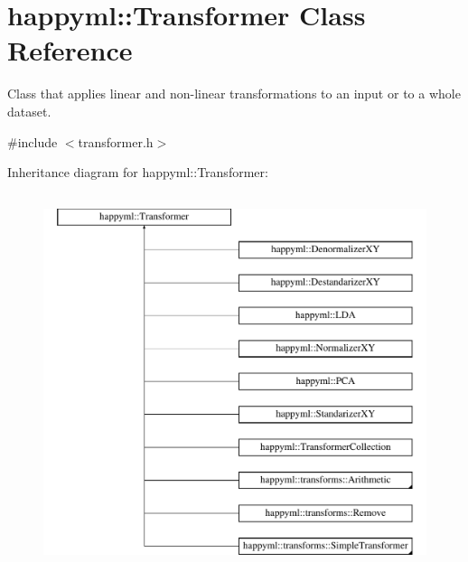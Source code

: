 \hypertarget{classhappyml_1_1Transformer}{}\section{happyml\+:\+:Transformer Class Reference}
\label{classhappyml_1_1Transformer}


Class that applies linear and non-\/linear transformations to an input or to a whole dataset.  




{\ttfamily \#include $<$transformer.\+h$>$}

Inheritance diagram for happyml\+:\+:Transformer\+:\begin{figure}[H]
\begin{center}
\leavevmode
\includegraphics[height=11.000000cm]{classhappyml_1_1Transformer}
\end{center}
\end{figure}

